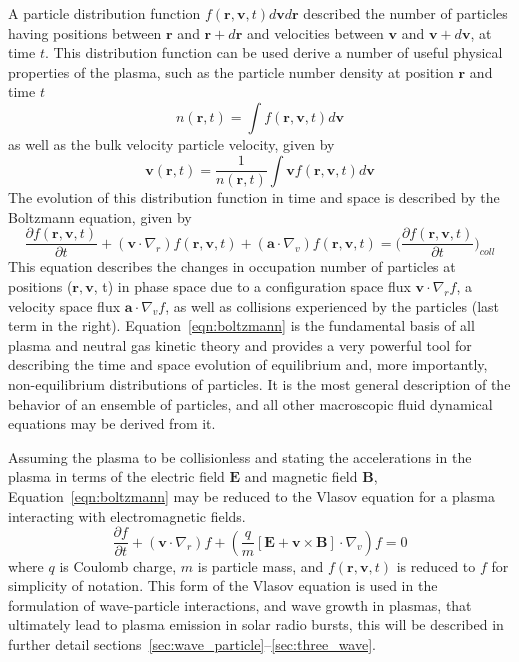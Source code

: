 A particle distribution function $f(\mathbf{r}, \mathbf{v}, t)d\mathbf{v}d\mathbf{r}$ described the number of particles having positions between $\mathbf{r}$ and $\mathbf{r}+d\mathbf{r}$ and velocities between $\mathbf{v}$ and $\mathbf{v}+d\mathbf{v}$, at time $t$. This distribution function can be used derive a number of useful physical properties of the plasma, such as the particle number density at position $\mathbf{r}$ and time $t$ 
\begin{equation}
n(\mathbf{r},t) = \int f(\mathbf{r}, \mathbf{v},t) d \mathbf{v}
\label{eqn:num_density}
\end{equation}
as well as the bulk velocity particle velocity, given by
\begin{equation}
 \mathbf{v}(\mathbf{r},t) = \frac{1}{n(\mathbf{r},t)}\int  \mathbf{v} f(\mathbf{r}, \mathbf{v},t) d \mathbf{v}
\label{eqn:bulk_flow}
\end{equation}
The evolution of this distribution function in time and space is described by the Boltzmann equation, given by
\begin{equation}
\frac{\partial f(\mathbf{r}, \mathbf{v},t)}{\partial t}  +     ( \mathbf{v}\cdot\nabla_r)f(\mathbf{r}, \mathbf{v},t)    + (\mathbf{a}\cdot\nabla_v)f(\mathbf{r}, \mathbf{v},t) = \bigg(\frac{\partial f(\mathbf{r}, \mathbf{v},t)}{\partial t}\bigg)_{coll}
\label{eqn:boltzmann}
\end{equation}
This equation describes the changes in occupation number of particles at positions ($\mathbf{r}, \mathbf{v}$, t) in phase space due to a configuration space flux $\mathbf{v}\cdot\nabla_rf$, a velocity space flux $ \mathbf{a}\cdot\nabla_vf$, as well as collisions experienced by the particles (last term in the right). Equation~\ref{eqn:boltzmann} is the fundamental basis of all plasma and neutral gas kinetic theory and provides a very powerful tool for describing the time and space evolution of equilibrium and, more importantly, non-equilibrium distributions of particles. It is the most general description of the behavior of an ensemble of particles, and all other macroscopic fluid dynamical equations may be derived from it.

Assuming  the plasma to be collisionless and stating the accelerations in the plasma in terms of the electric field $\mathbf{E}$ and magnetic field $\mathbf{B}$, Equation~\ref{eqn:boltzmann} may be reduced to the Vlasov equation for a plasma interacting with electromagnetic fields.
\begin{equation}
\frac{\partial f}{\partial t}  +(\mathbf{v}\cdot\nabla_r)f + (\frac{q}{m}[\mathbf{E} + \mathbf{v}\times \mathbf{B}]\cdot\nabla_v)f = 0
\end{equation}
where $q$ is Coulomb charge, $m$ is particle mass, and $f(\mathbf{r}, \mathbf{v},t)$ is reduced to $f$ for simplicity of notation. This form of the Vlasov equation is used in the formulation of wave-particle interactions, and wave growth in plasmas, that ultimately lead to plasma emission in solar radio bursts, this will be described in further detail sections~\ref{sec:wave_particle}--\ref{sec:three_wave}.

